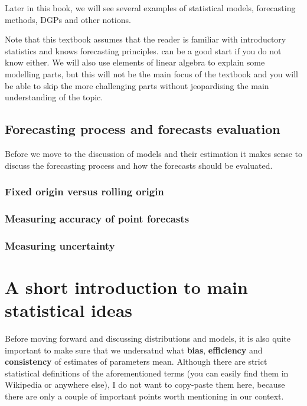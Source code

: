 \documentclass[]{book}
\begin{document}
Later in this book, we will see several examples of statistical models, forecasting methods, DGPs and other notions.

Note that this textbook assumes that the reader is familiar with introductory statistics and knows forecasting principles. \citep{Hyndman2018} can be a good start if you do not know either. We will also use elements of linear algebra to explain some modelling parts, but this will not be the main focus of the textbook and you will be able to skip the more challenging parts without jeopardising the main understanding of the topic.

\hypertarget{forecastingProcess}{%
\section{Forecasting process and forecasts evaluation}\label{forecastingProcess}}

Before we move to the discussion of models and their estimation it makes sense to discuss the forecasting process and how the forecasts should be evaluated.

\hypertarget{fixed-origin-versus-rolling-origin}{%
\subsection{Fixed origin versus rolling origin}\label{fixed-origin-versus-rolling-origin}}

\hypertarget{errorMeasures}{%
\subsection{Measuring accuracy of point forecasts}\label{errorMeasures}}

\hypertarget{measuring-uncertainty}{%
\subsection{Measuring uncertainty}\label{measuring-uncertainty}}

\hypertarget{a-short-introduction-to-main-statistical-ideas}{%
\chapter{A short introduction to main statistical ideas}\label{a-short-introduction-to-main-statistical-ideas}}

Before moving forward and discussing distributions and models, it is also quite important to make sure that we undersatnd what \textbf{bias}, \textbf{efficiency} and \textbf{consistency} of estimates of parameters mean. Although there are strict statistical definitions of the aforementioned terms (you can easily find them in Wikipedia or anywhere else), I do not want to copy-paste them here, because there are only a couple of important points worth mentioning in our context.
\end{document}
